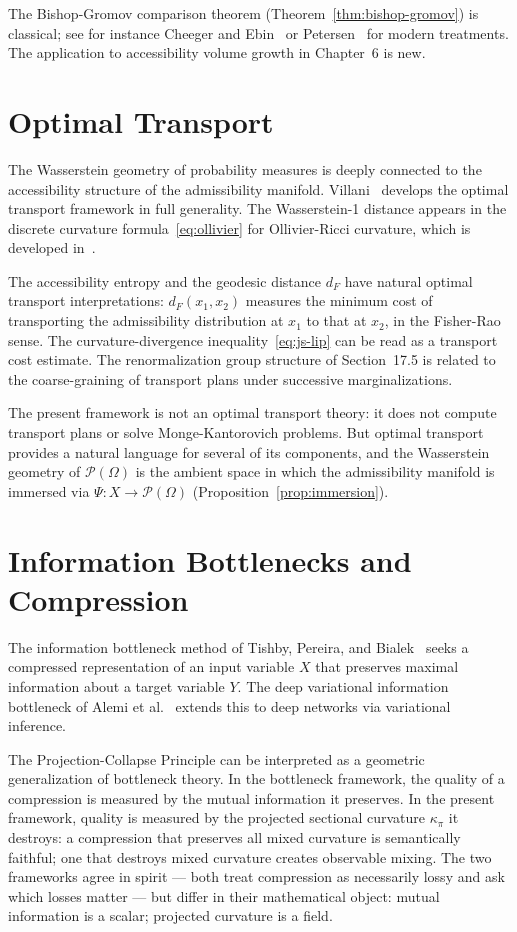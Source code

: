 \documentclass[12pt, oneside]{book}
\theoremstyle{plain-flyxion}
\theoremstyle{definition-flyxion}
\newcommand{\kpi}{\kappa_{\pi}}
\begin{document}
The Bishop-Gromov comparison theorem (Theorem~\ref{thm:bishop-gromov}) is classical; see
for instance Cheeger and Ebin~\cite{cheeger1975} or Petersen~\cite{petersen2016} for
modern treatments. The application to accessibility volume growth in Chapter~6 is new.

\section{Optimal Transport}

The Wasserstein geometry of probability measures is deeply connected to the accessibility
structure of the admissibility manifold. Villani~\cite{villani2009,villani2003} develops
the optimal transport framework in full generality. The Wasserstein-1 distance appears
in the discrete curvature formula~\eqref{eq:ollivier} for Ollivier-Ricci curvature,
which is developed in~\cite{ollivier2009}.

The accessibility entropy and the geodesic distance $d_F$ have natural optimal transport
interpretations: $d_F(x_1, x_2)$ measures the minimum cost of transporting the
admissibility distribution at $x_1$ to that at $x_2$, in the Fisher-Rao sense. The
curvature-divergence inequality~\eqref{eq:js-lip} can be read as a transport cost
estimate. The renormalization group structure of Section~17.5 is related to the
coarse-graining of transport plans under successive marginalizations.

The present framework is not an optimal transport theory: it does not compute transport
plans or solve Monge-Kantorovich problems. But optimal transport provides a natural
language for several of its components, and the Wasserstein geometry of $\mathcal{P}
(\Omega)$ is the ambient space in which the admissibility manifold is immersed via
$\Psi: X \to \mathcal{P}(\Omega)$ (Proposition~\ref{prop:immersion}).

\section{Information Bottlenecks and Compression}

The information bottleneck method of Tishby, Pereira, and Bialek~\cite{tishby2000}
seeks a compressed representation of an input variable $X$ that preserves maximal
information about a target variable $Y$. The deep variational information bottleneck
of Alemi et al.~\cite{alemi2017} extends this to deep networks via variational inference.

The Projection-Collapse Principle can be interpreted as a geometric generalization of
bottleneck theory. In the bottleneck framework, the quality of a compression is measured
by the mutual information it preserves. In the present framework, quality is measured by
the projected sectional curvature $\kpi$ it destroys: a compression that preserves all
mixed curvature is semantically faithful; one that destroys mixed curvature creates
observable mixing. The two frameworks agree in spirit --- both treat compression as
necessarily lossy and ask which losses matter --- but differ in their mathematical object:
mutual information is a scalar; projected curvature is a field.
\end{document}
